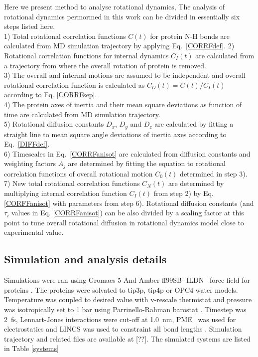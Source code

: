 \documentclass[pre,aps,floatfix,authordate1-4,twocolumn]{revtex4-1}
\begin{document}
Here we present method to analyse rotational dynamics,
The analysis of rotational dynamics permormed in this work can be
divided in essentially six steps listed here. \\
1) Total rotational correlation functions $C(t)$
for protein N-H bonds are calculated from MD simulation trajectory
by applying Eq.~\ref{CORRFdef}.
2) Rotational correlation functions for internal
dynamics $C_I(t)$ are calculated from a trajectory from where the overall
rotation of protein is removed. \\
3) The overall and internal motions are assumed to be independent and overall
rotational correlation function is calculated as $C_O(t)=C(t)/C_I(t)$ according to Eq. \ref{CORRFsep}. \\
4) The protein axes of inertia and their mean square deviations as function of
time are calculated from MD simulation trajectory. \\
5) Rotational diffusion constants $D_x$, $D_y$ and $D_z$ are calculated by fitting a straight line
to mean square angle deviations of inertia axes according to Eq.~\ref{DIFFdef}. \\
6) Timescales in Eq.~\ref{CORRFanisot} are calculated from diffusion constants and
weighting factors $A_j$ are determined by fitting the equation to
rotational correlation functions of overall rotational motion $C_0(t)$ determined in step 3). \\
7) New total rotational correlation functions $C_N(t)$ are determined by multiplying
internal correlation function $C_I(t)$ from step 2) by Eq. \ref{CORFFanisot} with
parameters from step 6). Rotational diffusion constants (and $\tau_i$ values in Eq. \ref{CORRFanisot})
can be also divided by a scaling factor at this point to tune overall
rotational diffusion in rotational dynamics model close to experimental value.



\subsection{Simulation and analysis details}
Simulations were ran using Gromacs 5 \cite{abraham15} And Amber ff99SB- ILDN~\cite{lindorff10}
force field for proteins . The proteins were solvated
to tip3p\cite{jorgensen83}, tip4p \cite{jorgensen83} or OPC4 \cite{izadi14} water models.
Temperature was coupled to desired value with v-rescale thermistat \cite{bussi07} and pressure was 
isotropically set to 1 bar using Parrinello-Rahman barostat \cite{parrinello81}.
Timestep was 2~fs, Lennart-Jones interactions were cut-off at 1.0~nm,
PME~\cite{darden93,essman95} was used for electrostatics and LINCS was used
to constraint all bond lengths \cite{hess07}. Simulation trajectory and related
files are available at [??].
The simulated systems are listed
in Table \ref{systems}
\end{document}
